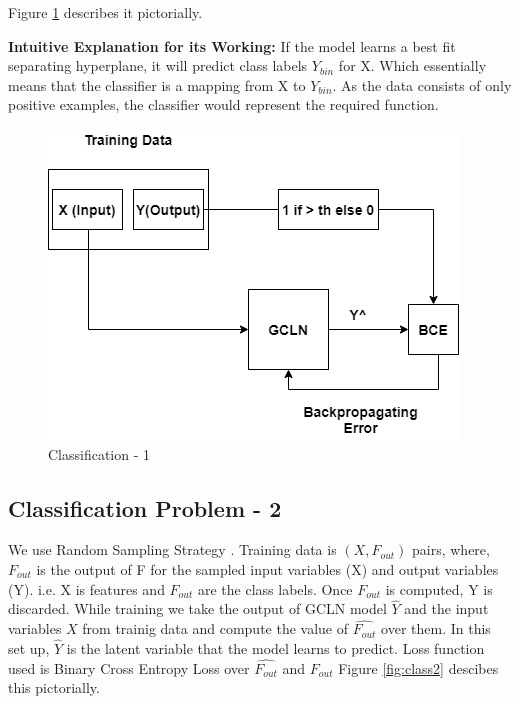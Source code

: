 Figure \ref{fig:class1} describes it pictorially.

\noindent\textbf{Intuitive Explanation for its Working: } If the model learns a best fit
separating hyperplane, it will predict class labels $Y_{bin}$ for X. Which essentially means that the classifier is 
a mapping from X to $Y_{bin}$. As the data consists of only positive examples, the classifier would 
represent the required function.

\begin{figure}
	\centering
    \includegraphics[scale=0.4]{class1.png}
    \caption{Classification - 1}
    \label{fig:class1}
\end{figure}

\subsection{Classification Problem - 2}\label{class2}
We use Random Sampling Strategy . Training data is $(X, F_{out})$ pairs, where, $F_{out}$ is the
output of F for the sampled input variables (X) and output variables (Y). i.e. X is features and $F_{out}$ 
are the class labels. Once $F_{out}$ is computed, Y is discarded.
While training we take the output of GCLN model $\hat{Y}$ and the input variables $X$ from trainig data
 and compute the value of $\hat{F_{out}}$ over them. In this set up, $\hat{Y}$ is the latent variable that 
 the model learns to predict. Loss function used is Binary Cross Entropy Loss over $\hat{F_{out}}$ and $F_{out}$
Figure \ref{fig:class2} descibes this pictorially.

